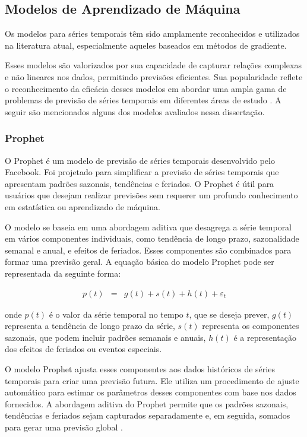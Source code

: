 \subsection{Modelos de Aprendizado de M\'aquina}\label{subsec:reg}

Os modelos para séries temporais têm sido amplamente reconhecidos e utilizados na literatura atual, especialmente aqueles baseados em métodos de gradiente. 

Esses modelos são valorizados por sua capacidade de capturar relações complexas e não lineares nos dados, permitindo previsões eficientes. Sua popularidade reflete o reconhecimento da eficácia desses modelos em abordar uma ampla gama de problemas de previsão de séries temporais em diferentes áreas de estudo \cite{al2021machine, sen2022machine, kheiri2023sentimentgpt}.
A seguir são mencionados alguns dos modelos avaliados nessa dissertação.


\subsubsection{Prophet}


O Prophet é um modelo de previsão de séries temporais desenvolvido pelo Facebook. Foi projetado para simplificar a previsão de séries temporais que apresentam padrões sazonais, tendências e feriados. O Prophet é útil para usuários que desejam realizar previsões sem requerer um profundo conhecimento em estatística ou aprendizado de máquina.

O modelo se baseia em uma abordagem aditiva que desagrega a série temporal em vários componentes individuais, como tendência de longo prazo, sazonalidade semanal e anual, e efeitos de feriados. Esses componentes são combinados para formar uma previsão geral.
A equação básica do modelo Prophet pode ser representada da seguinte forma:

\begin{eqnarray}
	 p(t) &=& g(t) + s(t) + h(t) + \varepsilon_t 
\end{eqnarray}

\noindent onde \( p(t) \) é o valor da série temporal no tempo \( t \), que se deseja prever, \( g(t) \) representa a tendência de longo prazo da série, \( s(t) \) representa os componentes sazonais, que podem incluir padrões semanais e anuais, \( h(t) \) é a representação dos efeitos de feriados ou eventos especiais.


O modelo Prophet ajusta esses componentes aos dados históricos de séries temporais para criar uma previsão futura. Ele utiliza um procedimento de ajuste automático para estimar os parâmetros desses componentes com base nos dados fornecidos. A abordagem aditiva do Prophet permite que os padrões sazonais, tendências e feriados sejam capturados separadamente e, em seguida, somados para gerar uma previsão global \cite{2-s2.0-85092514286}.

